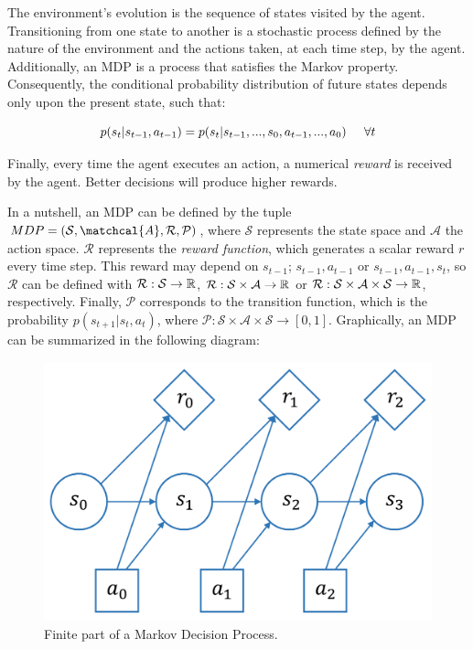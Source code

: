 The environment's evolution is the sequence of states visited by the agent. Transitioning from one state to another is a stochastic process defined by the nature of the environment and the actions taken, at each time step, by the agent. Additionally, an MDP is a process that satisfies the Markov property. Consequently, the conditional probability distribution of future states depends only upon the present state, such that:

\begin{equation}
    p(s_{t}|s_{t-1}, a_{t-1}) = p(s_{t}|s_{t-1},...,s_{0},a_{t-1},...,a_{0})  \hspace{0.5cm} \forall t
\end{equation}

Finally, every time the agent executes an action, a numerical \emph{reward} is received by the agent. Better decisions will produce higher rewards.

In a nutshell, an MDP can be defined by the tuple $MDP=(\mathcal{S},\matchcal{A},\mathcal{R},\mathcal{P})$, where $\mathcal{S}$ represents the state space and $\mathcal{A}$ the action space. $\mathcal{R}$ represents the \emph{reward function}, which generates a scalar reward $r$ every time step. This reward may depend on $s_{t-1}$; $s_{t-1},a_{t-1}$ or $s_{t-1},a_{t-1},s_{t}$, so $\mathcal{R}$ can be defined with $\mathcal{R}: \mathcal{S} \to \mathbb{R}$, $\mathcal{R}: \mathcal{S} \times \mathcal{A} \to \mathbb{R}$ or $\mathcal{R}: \mathcal{S} \times \mathcal{A} \times \mathcal{S} \to \mathbb{R}$, respectively. Finally, $\mathcal{P}$ corresponds to the transition function, which is the probability $p(s_{t+1}|s_{t}, a_{t})$, where $\mathcal{P}: \mathcal{S} \times \mathcal{A} \times \mathcal{S} \to [0, 1]$. Graphically, an MDP can be summarized in the following diagram:

\begin{figure}[H]
    \centering
    \includegraphics[width=0.6\linewidth]{imagenes/cap1/mdp.pdf}
    \caption{Finite part of a Markov Decision Process.}
    \label{fig:msim}
\end{figure}

